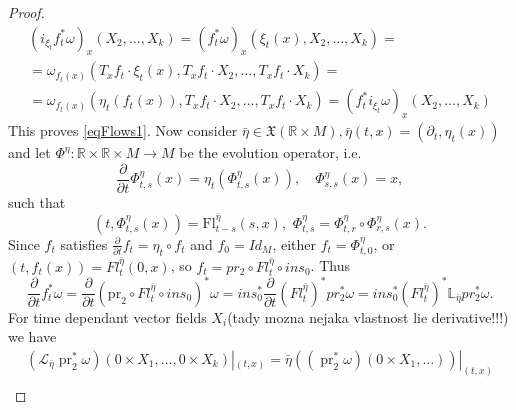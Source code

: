 \documentclass{article}
\theoremstyle{definition}
\begin{document}
\begin{proof}
    \begin{equation*}
        \begin{split}
           \left(i_{\xi_t} f_t^* \omega\right)_x\left(X_2, \ldots, X_k\right)=\left(f_t^* \omega\right)_x\left(\xi_t(x), X_2, \ldots, X_k\right)= \\
            =\omega_{f_t(x)}\left(T_x f_t \cdot \xi_t(x), T_x f_t \cdot X_2, \ldots, T_x f_t \cdot X_k\right)= \\
            =\omega_{f_t(x)}\left(\eta_t\left(f_t(x)\right), T_x f_t \cdot X_2, \ldots, T_x f_t \cdot X_k\right) = \left(f_t^* i_{\xi_t}  \omega\right)_x\left(X_2, \ldots, X_k\right)
        \end{split}
    \end{equation*}
    This proves \eqref{eqFlows1}. Now consider $\bar{\eta} \in \mathfrak{X}(\mathbb{R} \times M), \bar{\eta}(t, x)=\left(\partial_t, \eta_t(x)\right)$ and let $\Phi^\eta : \mathbb{R} \times \mathbb{R} \times M \rightarrow M$ be the evolution operator, i.e.
    \begin{equation*}
        \frac{\partial}{\partial t} \Phi_{t, s}^\eta(x)=\eta_t\left(\Phi_{t, s}^\eta(x)\right), \quad \Phi_{s, s}^\eta(x) = x,
    \end{equation*}
    such that 
    \begin{equation*}
        \left(t, \Phi_{t, s}^\eta(x)\right)=\mathrm{Fl}_{t-s}^{\bar{\eta}}(s, x), \hspace{4pt} \Phi_{t, s}^\eta=\Phi_{t, r}^\eta \circ \Phi_{r, s}^\eta(x).
    \end{equation*}
    Since $f_t$ satisfies 
    $\frac{\partial}{\partial t} f_t = \eta_t \circ f_t$ and $ f_0 = Id_M$, either $f_t = \Phi^\eta_{t,0}$, or $(t,f_t(x)) = Fl^{\bar{\eta}}_t(0,x)$, so $f_t = pr_2 \circ Fl^{\bar{\eta}}_t \circ ins_0$. Thus
    \begin{equation*}
        \frac{\partial}{\partial t} f_t^* \omega=\frac{\partial}{\partial t}\left(\mathrm{pr}_2 \circ Fl_t^{\bar{\eta}} \circ ins_0\right)^*\omega = ins_0^* \frac{\partial}{\partial t}(Fl_t^{\bar{\eta}})^*pr_2^*\omega = ins_0^*(Fl^{\bar{\eta}}_t)^*\mathbb{L}_{\bar{\eta}}pr_2^*\omega.
    \end{equation*}
    For time dependant vector fields $X_i$(tady mozna nejaka vlastnost lie derivative!!!) we have 
    \begin{equation*}
        \begin{split}
            \left(\mathcal{L}_{\bar{\eta}} \operatorname{pr}_2^* \omega\right) (0 \times X_1, \ldots,0 \times X_k)|_{(t,x)} = \bar{\eta} (( \operatorname{pr}_2^* \omega) (0 \times X_1, \ldots))|_{(t,x)} \\

\end{split}
\end{equation*}
\end{proof}
\end{document}
